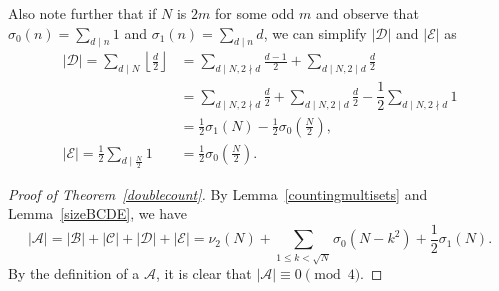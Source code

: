 \documentclass[a4paper,oneside,reqno]{amsart}
\theoremstyle{plain}
\theoremstyle{definition}
\theoremstyle{remark}
\newcommand{\A}{\mathcal{A}}
\begin{document}
        Also note further that if $N$ is $2m$ for some odd $m$ and observe that $\sigma_0(n)=\sum_{d \mid n} 1$ and $\sigma_1(n)=\sum_{d \mid n} d$, we can simplify $|\mathcal{D}|$ and $|\mathcal{E}|$ as  
		\begin{align*}
			|\mathcal{D}| = \sum_{d \mid N} \left\lfloor \frac{d}{2} \right\rfloor &= \sum_{d \mid N, 2 \nmid d} \frac{d-1}{2} + \sum_{d \mid N, 2 \mid d} \frac{d}{2} \\
			&= \sum\limits_{d \mid N, 2\nmid d} \frac{d}{2}+\sum\limits_{d \mid N, 2 \mid d} \frac{d}{2}-\dfrac{1}{2}\sum\limits_{d \mid N,2 \nmid d}1 \\
			&= \frac{1}{2}\sigma_1(N) - \frac{1}{2}\sigma_0\left(\frac{N}{2}\right), \\
			|\mathcal{E}| = \frac{1}{2}\sum\limits_{d \mid \frac{N}{2}} 1&= \frac{1}{2}\sigma_0\left(\frac{N}{2}\right). 
		\end{align*}
        


        \begin{proof}[Proof of Theorem~\ref{doublecount}]
		By Lemma~\ref{countingmultisets} and Lemma~\ref{sizeBCDE}, we have 
		\[
		|\A| = |\mathcal{B}| + |\mathcal{C}| + |\mathcal{D}| + |\mathcal{E}| = \nu_2(N) + \sum_{1 \leq k < \sqrt{N}} \sigma_0(N-k^2) + \frac{1}{2}\sigma_1(N). 
		\]
        By the definition of a $\A$, it is clear that $|\mathcal{A}| \equiv 0 \pmod 4$. 
		\end{proof}


        
\end{document}

